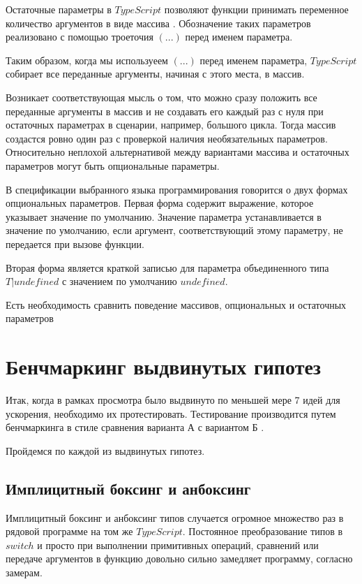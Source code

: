 \documentclass{mipt-thesis-bs}
\begin{document}
Остаточные параметры в $TypeScript$ позволяют функции
принимать переменное количество аргументов в виде массива \cite{tsspec}.
Обозначение таких параметров реализовано с помощью троеточия $(...)$
перед именем параметра.

Таким образом, когда мы используеем $(...)$ перед именем параметра,
$TypeScript$ собирает все переданные аргументы, начиная с этого места, в массив.

Возникает соответствующая мысль о том, что можно сразу положить все переданные
аргументы в массив и не создавать его каждый раз с нуля при остаточных параметрах
в сценарии, например, большого цикла. Тогда массив создастся ровно один раз с проверкой
наличия необязательных параметров. Относительно неплохой альтернативой между
вариантами массива и остаточных параметров могут быть опциональные параметры.

В спецификации выбранного языка программирования говорится о двух формах
опциональных параметров. Первая форма содержит выражение, которое
указывает значение по умолчанию. Значение параметра устанавливается
в значение по умолчанию, если аргумент, соответствующий
этому параметру, не передается при вызове функции.

Вторая форма является краткой записью для параметра объединенного типа
$T | undefined$ с значением по умолчанию $undefined$.

Есть необходимость сравнить поведение массивов, опциональных и остаточных параметров

\section{Бенчмаркинг выдвинутых гипотез}

Итак, когда в рамках просмотра было выдвинуто по меньшей мере 7 идей для ускорения,
необходимо их протестировать. Тестирование производится путем бенчмаркинга в стиле
сравнения варианта А с вариантом Б \cite{benchmark-book}.

Пройдемся по каждой из выдвинутых гипотез.
\subsection{Имплицитный боксинг и анбоксинг}
Имплицитный боксинг и анбоксинг типов случается огромное множество раз в рядовой программе
на том же $TypeScript$. Постоянное преобразование типов в $switch$ и просто при выполнении
примитивных операций, сравнений или передаче аргументов в функцию довольно сильно замедляет
программу, согласно замерам.
\end{document}
